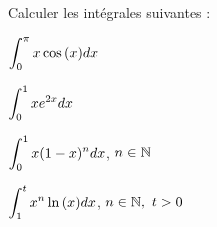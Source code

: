 \documentclass[a4paper, 11pt,reqno]{article}
\begin{document}
\begin{exercice}   \;
	Calculer les int\'egrales suivantes :
	\begin{enumerate}
		\begin{minipage}[t]{0.45\textwidth}
			\item $\displaystyle \int_{0}^{\pi} x\cos{(x)} dx$\vsec
			\item $\displaystyle \int_{0}^{1} xe^{2x} dx$
		\end{minipage}
		\begin{minipage}[t]{0.45\textwidth}
			\item $\displaystyle \int_{0}^{1} x(1-x)^n dx$, $n\in\mathbb{N}$\vsec
			\item $\displaystyle \int_{1}^{t} x^n \ln{(x)} dx$, $n\in\mathbb{N},\ t>0$
		\end{minipage}
	\end{enumerate}
\end{exercice}
\end{document}
